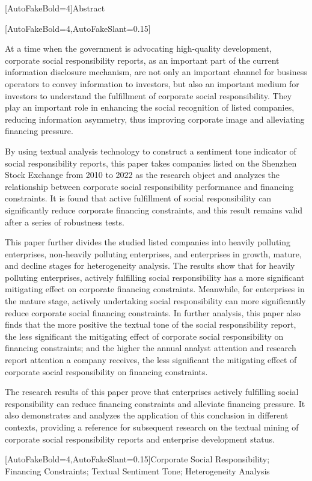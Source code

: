 \documentclass[12pt,a4paper]{article}
\newcommand{\maintextfont}{\CJKfontspec{SimSun}[AutoFakeBold=4,AutoFakeSlant=0.15]\fontsize{12pt}{24pt}\selectfont}
\newcommand{\sectiontitlefont}{\CJKfontspec{SimHei}[AutoFakeBold=4]\fontsize{14pt}{24pt}\selectfont}
\newcommand{\keywordtitlefont}{\CJKfontspec{SimHei}[AutoFakeBold=4]\fontsize{12pt}{24pt}\selectfont}
\newenvironment{abstracten}{%
    {\centering\sectiontitlefont Abstract\par}
    \par\maintextfont
}{%
    \par
}
\newcommand{\keywordsen}[1]{\noindent{\keywordtitlefont Keywords:}\maintextfont #1}
\begin{document}
\vspace{1cm}
\newpage
\begin{abstracten}
    At a time when the government is advocating high-quality development, corporate social responsibility reports, as an important part of the current information disclosure mechanism, are not only an important channel for business operators to convey information to investors, but also an important medium for investors to understand the fulfillment of corporate social responsibility. They play an important role in enhancing the social recognition of listed companies, reducing information asymmetry, thus improving corporate image and alleviating financing pressure.

    By using textual analysis technology to construct a sentiment tone indicator of social responsibility reports, this paper takes companies listed on the Shenzhen Stock Exchange from 2010 to 2022 as the research object and analyzes the relationship between corporate social responsibility performance and financing constraints. It is found that active fulfillment of social responsibility can significantly reduce corporate financing constraints, and this result remains valid after a series of robustness tests.

    This paper further divides the studied listed companies into heavily polluting enterprises, non-heavily polluting enterprises, and enterprises in growth, mature, and decline stages for heterogeneity analysis. The results show that for heavily polluting enterprises, actively fulfilling social responsibility has a more significant mitigating effect on corporate financing constraints. Meanwhile, for enterprises in the mature stage, actively undertaking social responsibility can more significantly reduce corporate social financing constraints. In further analysis, this paper also finds that the more positive the textual tone of the social responsibility report, the less significant the mitigating effect of corporate social responsibility on financing constraints; and the higher the annual analyst attention and research report attention a company receives, the less significant the mitigating effect of corporate social responsibility on financing constraints.

    The research results of this paper prove that enterprises actively fulfilling social responsibility can reduce financing constraints and alleviate financing pressure. It also demonstrates and analyzes the application of this conclusion in different contexts, providing a reference for subsequent research on the textual mining of corporate social responsibility reports and enterprise development status.
\end{abstracten}
\keywordsen{Corporate Social Responsibility; Financing Constraints; Textual Sentiment Tone; Heterogeneity Analysis}
\end{document}
